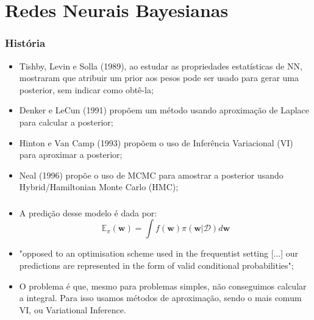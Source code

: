 \documentclass{beamer}
\begin{document}
\section{Redes Neurais Bayesianas}

\begin{frame}
    \frametitle{História}

    \begin{itemize}
        \item Tishby, Levin e Solla (1989), ao estudar as propriedades estatísticas de NN, mostraram que atribuir um prior aos pesos pode ser usado para gerar uma posterior, sem indicar como obtê-la;
        \item Denker e LeCun (1991) propõem um método usando aproximação de Laplace para calcular a posterior;
        \item Hinton e Van Camp (1993) propõem o uso de Inferência Variacional (VI) para aproximar a posterior;
        \item Neal (1996) propõe o uso de MCMC para amostrar a posterior usando Hybrid/Hamiltonian Monte Carlo (HMC);
    \end{itemize}

\end{frame}


\begin{frame}
    \frametitle{}

    \begin{itemize}
        \item A predição desse modelo é dada por:
        $$ \mathbb{E}_\pi (\mathbf{w}) = \int f(\mathbf{w})\pi(\mathbf{w}|\mathcal{D}) d\mathbf{w} $$
        \item "opposed to an optimisation scheme used in the frequentist setting [...] our predictions are represented in the form of valid conditional probabilities";
        \item O problema é que, mesmo para problemas simples, não conseguimos calcular a integral. Para isso usamos métodos de aproximação, sendo o mais comum VI, ou Variational Inference.
    \end{itemize}
\end{frame}
\end{document}
